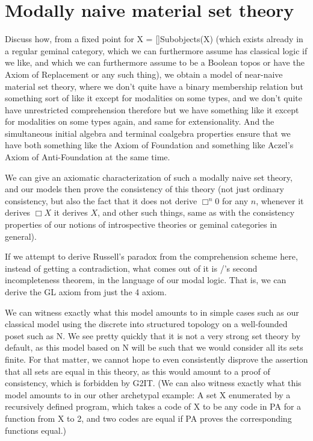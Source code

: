 \filestart

\section{Modally naive material set theory}

\begin{TODOblock}
Discuss how, from a fixed point for X = []Subobjects(X) (which exists already in a regular geminal category, which we can furthermore assume has classical logic if we like, and which we can furthermore assume to be a Boolean topos or have the Axiom of Replacement or any such thing), we obtain a model of near-naive material set theory, where we don't quite have a binary membership relation but something sort of like it except for modalities on some types, and we don't quite have unrestricted comprehension therefore but we have something like it except for modalities on some types again, and same for extensionality. And the simultaneous initial algebra and terminal coalgebra properties ensure that we have both something like the Axiom of Foundation and something like Aczel's Axiom of Anti-Foundation at the same time.

We can give an axiomatic characterization of such a modally naive set theory, and our models then prove the consistency of this theory (not just ordinary consistency, but also the fact that it does not derive $\Box^n 0$ for any $n$, whenever it derives $\Box X$ it derives $X$, and other such things, same as with the consistency properties of our notions of introspective theories or geminal categories in general).

If we attempt to derive Russell's paradox from the comprehension scheme here, instead of getting a contradiction, what comes out of it is \Goedel/'s second incompleteness theorem, in the language of our modal logic. That is, we can derive the GL axiom from just the 4 axiom.

We can witness exactly what this model amounts to in simple cases such as our classical model using the discrete into structured topology on a well-founded poset such as N. We see pretty quickly that it is not a very strong set theory by default, as this model based on N will be such that we would consider all its sets finite. For that matter, we cannot hope to even consistently disprove the assertion that all sets are equal in this theory, as this would amount to a proof of consistency, which is forbidden by G2IT. (We can also witness exactly what this model amounts to in our other archetypal example: A set X enumerated by a recursively defined program, which takes a code of X to be any code in PA for a function from X to 2, and two codes are equal if PA proves the corresponding functions equal.)


\end{TODOblock}
